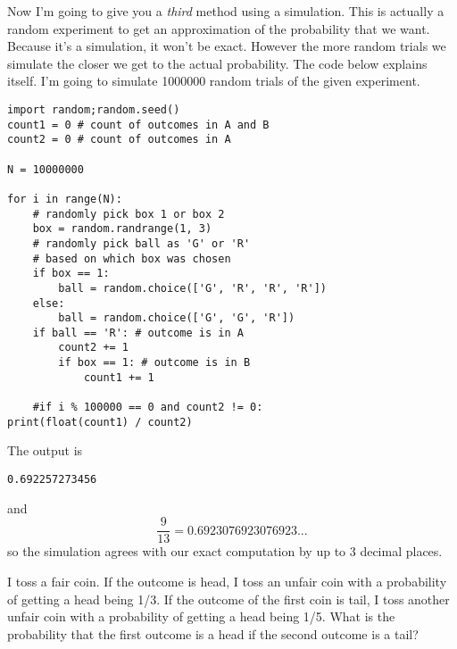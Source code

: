 Now I'm going to give you a \textit{third} method using a simulation.
This is actually a random experiment to get an approximation
of the probability that we want.
Because it's a simulation, it won't be exact.
However the more random trials we simulate the closer we get
to the actual probability.
The code below explains itself.
I'm going to simulate 1000000 random trials of the given experiment.
\begin{Verbatim}[frame=single, fontsize=\small]
import random;random.seed()
count1 = 0 # count of outcomes in A and B
count2 = 0 # count of outcomes in A

N = 10000000

for i in range(N):  
    # randomly pick box 1 or box 2
    box = random.randrange(1, 3)
    # randomly pick ball as 'G' or 'R'
    # based on which box was chosen
    if box == 1:
        ball = random.choice(['G', 'R', 'R', 'R'])
    else:
        ball = random.choice(['G', 'G', 'R'])
    if ball == 'R': # outcome is in A
        count2 += 1
        if box == 1: # outcome is in B
            count1 += 1

    #if i % 100000 == 0 and count2 != 0:
print(float(count1) / count2)
\end{Verbatim}
The output is 
\begin{Verbatim}[frame=single, fontsize=\small]
0.692257273456
\end{Verbatim}
and 
\[
\frac{9}{13} = 0.6923076923076923...
\]
so the simulation agrees with our exact computation by up to 3 decimal
places.

\newpage

\begin{ex}
I toss a fair coin.
If the outcome is head, I toss an unfair coin with a probability of getting
a head being 1/3.
If the outcome of the first coin is tail, 
I toss another unfair coin with a probability of getting a head being 1/5.
What is the probability that the first outcome
is a head if the second outcome is a tail?
\end{ex}

